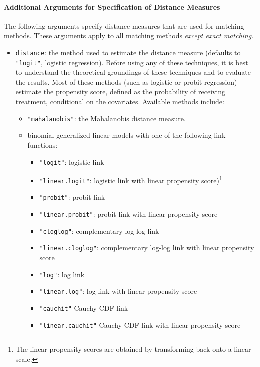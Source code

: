 \paragraph{Additional Arguments for Specification of
  Distance Measures}
\label{subsubsec:inputs-all}

The following arguments specify distance measures that are used for
matching methods. These arguments apply to all matching methods {\it
  except exact matching}.

\begin{itemize}
  
\item \texttt{distance}: the method used to estimate the distance
  measure (defaults to {\tt "logit"}, logistic regression).  Before using
  any of these techniques, it is best to understand the theoretical
  groundings of these techniques and to evaluate the results.  Most of
  these methods (such as logistic or probit regression) estimate
  the propensity score, defined as the probability of receiving
  treatment, conditional on the covariates.  Available methods
include:  
  \begin{itemize}
  \item {\tt "mahalanobis"}: the Mahalanobis distance measure.
  \item binomial generalized linear models with one of the following
link functions: 
    \begin{itemize}
    \item \texttt{"logit"}: logistic link 
    \item {\tt "linear.logit"}: logistic link with linear propensity
      score)\footnote{The linear propensity scores are obtained by
        transforming back onto a linear scale.}
    \item \texttt{"probit"}: probit link
    \item {\tt "linear.probit"}: probit link with linear propensity
      score
    \item {\tt "cloglog"}: complementary log-log link
    \item {\tt "linear.cloglog"}: complementary log-log link with linear
      propensity score
    \item {\tt "log"}: log link
    \item {\tt "linear.log"}: log link with linear propensity score
    \item {\tt "cauchit"} Cauchy CDF link
    \item {\tt "linear.cauchit"} Cauchy CDF link with linear propensity
      score

\end{itemize}
\end{itemize}
\end{itemize}
